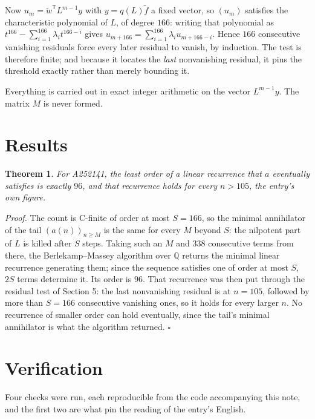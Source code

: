 \documentclass[11pt]{article}
\newtheorem{theorem}{Theorem}
\theoremstyle{definition}
\begin{document}
Now $u_m = \tilde w^{\mathsf T} L^{m-1} y$ with $y = q(L)\tilde f$ a fixed vector, so $(u_m)$ satisfies the characteristic polynomial of $L$, of degree $166$: writing that polynomial as $t^{166} - \sum_{i=1}^{166} \lambda_i t^{166-i}$ gives $u_{m+166} = \sum_{i=1}^{166} \lambda_i u_{m+166-i}$. Hence $166$ consecutive vanishing residuals force every later residual to vanish, by induction. The test is therefore finite; and because it locates the {\itshape last} nonvanishing residual, it pins the threshold exactly rather than merely bounding it.

Everything is carried out in exact integer arithmetic on the vector $L^{m-1}y$. The matrix $M$ is never formed.

\section{Results}

\begin{theorem} For A252141, the least order of a linear recurrence that $a$ eventually satisfies is exactly $96$, and that recurrence holds for every $n > 105$, the entry's own figure.\end{theorem}

{\itshape Proof.} The count is C-finite of order at most $S = 166$, so the minimal annihilator of the tail $(a(n))_{n \ge M}$ is the same for every $M$ beyond $S$: the nilpotent part of $L$ is killed after $S$ steps. Taking such an $M$ and $338$ consecutive terms from there, the Berlekamp--Massey algorithm over $\mathbb{Q}$ returns the minimal linear recurrence generating them; since the sequence satisfies one of order at most $S$, $2S$ terms determine it. Its order is $96$. That recurrence was then put through the residual test of Section 5: the last nonvanishing residual is at $n = 105$, followed by more than $S = 166$ consecutive vanishing ones, so it holds for every larger $n$. No recurrence of smaller order can hold eventually, since the tail's minimal annihilator is what the algorithm returned. $\square$

\section{Verification}

Four checks were run, each reproducible from the code accompanying this note, and the first two are what pin the reading of the entry's English.
\end{document}
